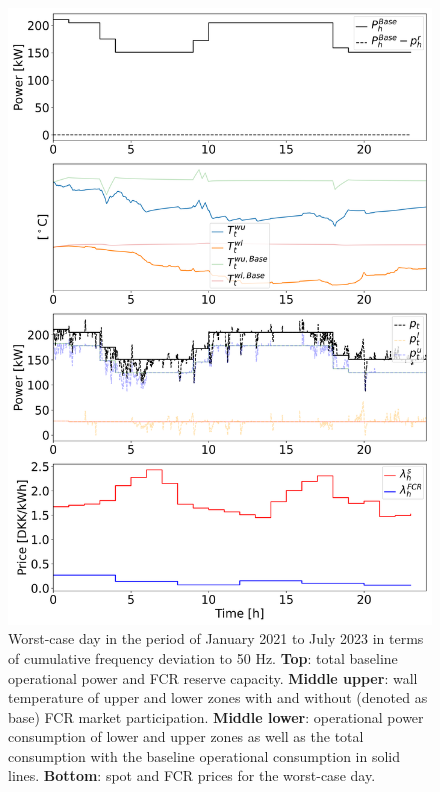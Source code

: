 \documentclass[conference]{IEEEtran}
\begin{document}
\begin{figure}[t]
    \centering
    \includegraphics[width=\columnwidth]{../figures/fcr_single_case.png}
    \caption{\small{Worst-case day in the period of January 2021 to July 2023 in terms of cumulative frequency deviation to 50 Hz. \textbf{Top}: total baseline operational power and FCR reserve capacity. \textbf{Middle upper}: wall temperature of upper and lower zones with and without (denoted as base) FCR market participation. \textbf{Middle lower}: operational power consumption of lower and upper zones as well as the total consumption with the baseline operational consumption in solid lines. \textbf{Bottom}: spot and FCR prices for the worst-case day. \vspace{-3mm}}}
    \label{fig:fcr_single_case}
\end{figure}
\end{document}

